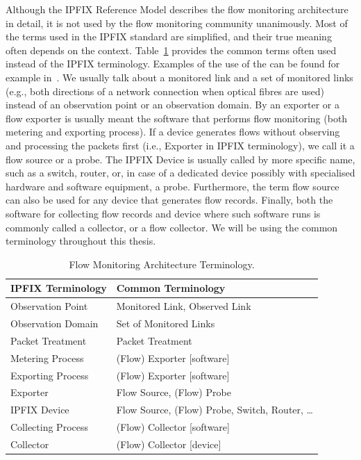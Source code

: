 Although the IPFIX Reference Model describes the flow monitoring architecture in detail, it is not used by the flow monitoring community unanimously. Most of the terms used in the IPFIX standard are simplified, and their true meaning often depends on the context. Table~\ref{tab:flow_monitoring_terminology} provides the common terms often used instead of the IPFIX terminology. Examples of the use of the  can be found for example in~\cite{Hofstede-2014-Flow, Cejka-2015-Using, Brownlee-2011-Flow, Krmicek-2009-Netflow, Lee-2007-End, Lee-2007-IPv6, Molina-2006-Design}. We usually talk about a monitored link and a set of monitored links (e.g., both directions of a network connection when optical fibres are used) instead of an observation point or an observation domain. By an exporter or a flow exporter is usually meant the software that performs flow monitoring (both metering and exporting process). If a device generates flows without observing and processing the packets first (i.e., Exporter in IPFIX terminology), we call it a flow source or a probe. The IPFIX Device is usually called by more specific name, such as a switch, router, or, in case of a dedicated device possibly with specialised hardware and software equipment, a probe. Furthermore, the term flow source can also be used for any device that generates flow records. Finally, both the software for collecting flow records and device where such software runs is commonly called a collector, or a flow collector. We will be using the common terminology throughout this thesis.

\begin{table}[t!]
    \centering
    \begin{tabular}{ll}
    \toprule
        \textbf{IPFIX Terminology}  & \textbf{Common Terminology}                 \\ \midrule
        Observation Point   &  Monitored Link, Observed Link                      \\
        Observation Domain  &  Set of Monitored Links                             \\
        Packet Treatment    &  Packet Treatment                                   \\
        Metering Process    &  (Flow) Exporter [software]                         \\
        Exporting Process   &  (Flow) Exporter [software]                         \\
        Exporter            &  Flow Source, (Flow) Probe                          \\
        IPFIX Device        &  Flow Source, (Flow) Probe, Switch, Router, \ldots  \\
        Collecting Process  &  (Flow) Collector [software]                        \\
        Collector           &  (Flow) Collector [device]                          \\ \bottomrule
    \end{tabular}
    \caption{Flow Monitoring Architecture Terminology.}
    \label{tab:flow_monitoring_terminology}
\end{table}


